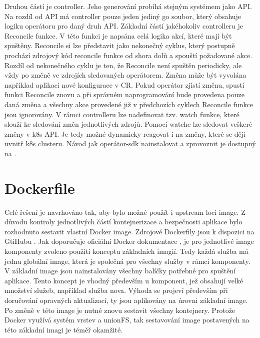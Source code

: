 Druhou částí je controller. Jeho generování probíhá stejným systémem jako API. Na rozdíl od API má controller pouze jeden jediný go soubor, který obsahuje logiku operátoru pro daný druh API. Základní částí jakéhokoliv controlleru je Reconcile funkce. V této funkci je napsána celá logika akcí, které mají být spuštěny. Reconcile si lze představit jako nekonečný cyklus, který postupně prochází zdrojový kód reconcile funkce od shora dolů a spouští požadované akce. Rozdíl od nekonečného cyklu je ten, že Reconcile není spuštěn periodicky, ale vždy po změně ve zdrojích sledovaných operátorem. Změna může být vyvolána například aplikací nové konfigurace v CR. Pokud operátor zjistí změnu, spustí funkci Reconcile znovu a při správném naprogramování bude provedena pouze daná změna a všechny akce provedené již v předchozích cyklech Reconcile funkce jsou ignorovány. V rámci controlleru lze nadefinovat tzv. watch funkce, které slouží ke sledování změn jednotlivých zdrojů. Pomocí watche lze sledovat veškeré změny v k8s API. Je tedy možné dynamicky reagovat i na změny, které se dějí uvnitř k8s clusteru. Návod jak operátor-sdk nainstalovat a zprovoznit je dostupný na \cite{okd_gettingstarted}.

\section{Dockerfile}
Celé řešení je navrhováno tak, aby bylo možné použít i upstream loci image. Z důvodu kontroly jednotlivých částí kontejnerizace a bezpečnosti aplikace bylo rozhodnuto sestavit vlastní Docker image. Zdrojové Dockerfily jsou k dispozici na GtiHubu \cite{gh_openstack_images}. Jak doporučuje oficiální Docker dokumentace \cite{docker_docs}, je pro jednotlivé image komponenty zvoleno použití konceptu základních imagií. Tedy každá služba má jednu globální image, která je společná pro všechny služby v rámci komponenty. V základní image jsou nainstalovány všechny balíčky potřebné pro spuštění aplikace. Tento koncept je vhodný především u komponent, jež obsahují velké množství služeb, například služba nova. Výhoda se projeví především při doručování opravných aktualizací, ty jsou aplikovány na úrovni základní image. Po změně v této image je nutné znovu sestavit všechny kontejnery. Protože Docker využívá systém vrstev a unionFS, tak sestavování image postavených na této základní imagi je téměř okamžité.

